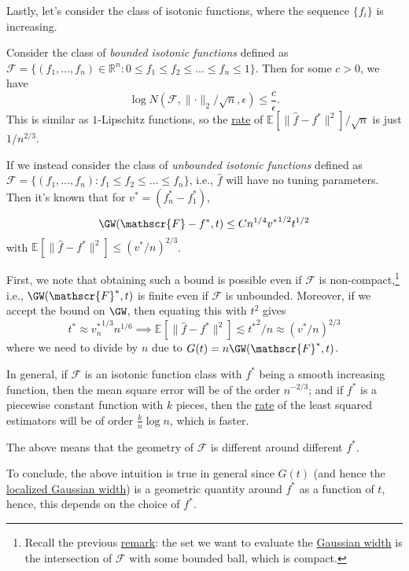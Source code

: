Lastly, let's consider the class of isotonic functions, where the sequence \(\{ f_i \} \) is increasing.

\begin{eg}
	Consider the class of \emph{bounded isotonic functions} defined as \(\mathscr{F} = \{(f_1, \dots , f_n) \in \mathbb{R} ^n \colon 0 \leq f_1 \leq f_2 \leq \dots \leq f_n \leq 1 \}\). Then for some \(c > 0\), we have
	\[
		\log N(\mathscr{F} , \lVert \cdot \rVert _2 / \sqrt{n} , \epsilon ) \leq \frac{c}{\epsilon }.
	\]
	This is similar as \(1\)-Lipschitz functions, so the \hyperref[def:rate-of-convergence]{rate} of \(\mathbb{E}_{}[\lVert \hat{f} - f^{\ast} \rVert ^2 ] / \sqrt{n} \) is just \(1 / n^{2 / 3}\).
\end{eg}

\begin{eg}
	If we instead consider the class of \emph{unbounded isotonic functions} defined as \(\mathscr{F} = \{(f_1, \dots , f_n) \colon f_1 \leq f_2 \leq \dots \leq f_n \}\), i.e., \(\hat{f} \) will have no tuning parameters. Then it's known that for \(v^{\ast} = (f^{\ast} _n - f^{\ast} _1)\),
	\[
		\GW(\mathscr{F} - f^{\ast} , t) \leq C n^{1 / 4} {v^{\ast} }^{1 / 2} t^{1 / 2}
	\]
	with \(\mathbb{E}_{}[\lVert \hat{f} - f^{\ast}  \rVert ^2 ] \leq (v^{\ast} / n)^{2 / 3}\).
\end{eg}
\begin{explanation}
	First, we note that obtaining such a bound is possible even if \(\mathscr{F} \) is non-compact,\footnote{Recall the previous \hyperref[rmk:GW]{remark}: the set we want to evaluate the \hyperref[def:Gaussian-width]{Gaussian width} is the intersection of \(\mathscr{F} \) with some bounded ball, which is compact.} i.e., \(\GW(\mathscr{F} ^{\ast} , t)\) is finite even if \(\mathscr{F} \) is unbounded. Moreover, if we accept the bound on \(\GW\), then equating this with \(t^2\) gives
	\[
		t^{\ast} \approx {v^{\ast} _n}^{1 / 3} n^{1 / 6}
		\implies \mathbb{E}_{}\left[\lVert \hat{f} - f^{\ast} \rVert ^2 \right] \lesssim {t^{\ast} }^2 / n \approx (v^{\ast} / n)^{2 / 3}
	\]
	where we need to divide by \(n\) due to \(G(t) = n \GW(\mathscr{F} ^{\ast} , t)\).
\end{explanation}

In general, if \(\mathscr{F} \) is an isotonic function class with \(f^{\ast} \) being a smooth increasing function, then the mean square error will be of the order \(n^{-2 / 3}\); and if \(f^{\ast} \) is a piecewise constant function with \(k\) pieces, then the \hyperref[def:rate-of-convergence]{rate} of the least squared estimators will be of order \(\frac{k}{n}\log n\), which is faster.

\begin{intuition}
	The above means that the geometry of \(\mathscr{F} \) is different around different \(f^{\ast} \).
\end{intuition}

To conclude, the above intuition is true in general since \(G(t)\) (and hence the \hyperref[def:localized-Gaussian-width]{localized Gaussian width}) is a geometric quantity around \(f^{\ast} \) as a function of \(t\), hence, this depends on the choice of \(f^{\ast} \).